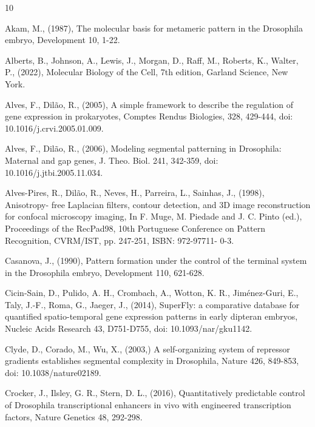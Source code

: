 \documentclass[final,authoryear, 5p, times]{elsarticle}
\begin{document}
\begin{thebibliography}{10}

  Akam, M., (1987), The molecular basis for metameric pattern in the Drosophila embryo, Development 10, 1-22.

 Alberts, B., Johnson, A., Lewis, J., Morgan, D., Raff, M., Roberts, K., Walter, P., (2022), Molecular Biology of the Cell, 7th edition, Garland Science, New York.

  Alves, F., Dil\~ao, R., (2005),  A simple framework to describe the regulation of gene expression in prokaryotes, Comptes Rendus Biologies, 328, 429-444, doi: 10.1016/j.crvi.2005.01.009.

  Alves, F., Dil\~ao, R., (2006),  Modeling segmental patterning in Drosophila: Maternal and gap genes, J. Theo. Biol. 241, 342-359, doi: 10.1016/j.jtbi.2005.11.034.

 Alves-Pires, R., Dil\~ao, R., Neves, H., Parreira, L.,  Sainhas, J., (1998), Anisotropy- free Laplacian filters, contour detection, and 3D image reconstruction for confocal microscopy imaging, In F. Muge, M. Piedade and J. C. Pinto (ed.), Proceedings of the RecPad98, 10th Portuguese Conference on Pattern Recognition, CVRM/IST, pp. 247-251,  ISBN: 972-97711- 0-3.

  Casanova, J., (1990), Pattern formation under the control of the terminal system in the Drosophila embryo, Development 110,  621-628.

   Cicin-Sain, D., Pulido, A. H., Crombach,  A.,  Wotton, K. R., Jim\'enez-Guri, E., Taly, J.-F., Roma, G.,  Jaeger, J., (2014), SuperFly: a comparative database for quantified spatio-temporal gene expression patterns in early dipteran embryos, Nucleic Acids Research 43, D751-D755, doi: 10.1093/nar/gku1142.

  Clyde, D.,   Corado, M.,  Wu, X., (2003,)  A self-organizing system of repressor gradients establishes segmental complexity in Drosophila, Nature 426, 849-853, doi: 10.1038/nature02189.

  Crocker, J.,  Ilsley, G. R.,   Stern, D. L., (2016), Quantitatively predictable control of Drosophila transcriptional enhancers in vivo with engineered transcription factors, Nature Genetics 48, 292-298.


\end{thebibliography}
\end{document}
